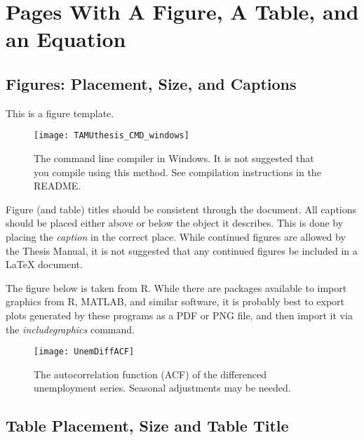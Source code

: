 %
%
%



\chapter{Pages With A Figure, A Table, and an Equation}
\section{Figures: Placement, Size, and Captions}
This is a figure template.

\begin{figure}[!htb]
	\centering
	\texttt{[image: TAMUthesis\_CMD\_windows]}
	\caption[The command line compiler in Windows.]{The command line compiler in Windows. It is not suggested that you compile using this method. See compilation instructions in the README.}
	\label{fig:CMD_1}
\end{figure}

Figure (and table) titles should be consistent through the document. All captions should be placed either above or below the object it describes. This is done by placing the \textit{caption} in the correct place. While continued figures are allowed by the Thesis Manual, it is not suggested that any continued figures be included in a \LaTeX{} document.

The figure below is taken from R. While there are packages available to import graphics from R, MATLAB, and similar software, it is probably best to export plots generated by these programs as a PDF or PNG file, and then import it via the \textit{includegraphics} command.

\begin{figure}[!htb]
	\centering
	\texttt{[image: UnemDiffACF]}
	\caption{The autocorrelation function (ACF) of the differenced unemployment series. Seasonal adjustments may be needed.}
\end{figure}

\section{Table Placement, Size and Table Title}

